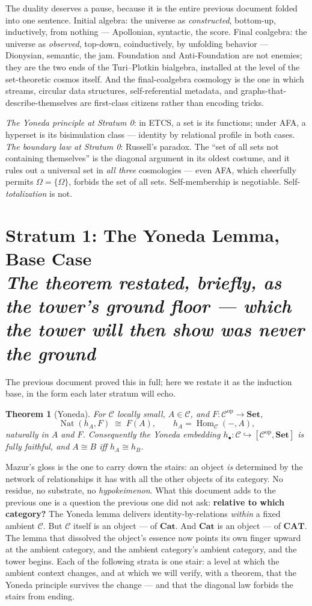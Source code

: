 \documentclass[11pt]{article}
\theoremstyle{plain}
\newtheorem{theorem}{Theorem}[section]
\theoremstyle{definition}
\theoremstyle{remark}
\newcommand{\C}{\mathcal{C}}
\newcommand{\Set}{\mathbf{Set}}
\newcommand{\Cat}{\mathbf{Cat}}
\newcommand{\CAT}{\mathbf{CAT}}
\newcommand{\Hom}{\operatorname{Hom}}
\newcommand{\Nat}{\operatorname{Nat}}
\newcommand{\op}{\mathrm{op}}
\newcommand{\stratum}[2]{\section{#1 \\ {\normalsize\normalfont\itshape #2}}}
\begin{document}
The duality deserves a pause, because it is the entire previous document folded into one sentence. Initial algebra: the universe as \emph{constructed}, bottom-up, inductively, from nothing --- Apollonian, syntactic, the score. Final coalgebra: the universe as \emph{observed}, top-down, coinductively, by unfolding behavior --- Dionysian, semantic, the jam. Foundation and Anti-Foundation are not enemies; they are the two ends of the Turi--Plotkin bialgebra, installed at the level of the set-theoretic cosmos itself. And the final-coalgebra cosmology is the one in which streams, circular data structures, self-referential metadata, and graphs-that-describe-themselves are first-class citizens rather than encoding tricks.

\begin{refrain}
\emph{The Yoneda principle at Stratum 0}: in ETCS, a set is its functions; under AFA, a hyperset is its bisimulation class --- identity by relational profile in both cases. \emph{The boundary law at Stratum 0}: Russell's paradox. The ``set of all sets not containing themselves'' is the diagonal argument in its oldest costume, and it rules out a universal set in \emph{all three} cosmologies --- even AFA, which cheerfully permits $\Omega = \{\Omega\}$, forbids the set of all sets. Self-membership is negotiable. Self-\emph{totalization} is not.
\end{refrain}

\stratum{Stratum 1: The Yoneda Lemma, Base Case}{The theorem restated, briefly, as the tower's ground floor --- which the tower will then show was never the ground}

The previous document proved this in full; here we restate it as the induction base, in the form each later stratum will echo.

\begin{theorem}[Yoneda]\label{thm:yoneda}
For $\C$ locally small, $A \in \C$, and $F\colon \C^{\op} \to \Set$,
\[
\Nat(h_A, F) \;\cong\; F(A), \qquad h_A = \Hom_\C(-,A),
\]
naturally in $A$ and $F$. Consequently the Yoneda embedding $h_\bullet\colon \C \hookrightarrow [\C^{\op}, \Set]$ is fully faithful, and $A \cong B$ iff $h_A \cong h_B$.
\end{theorem}

Mazur's gloss is the one to carry down the stairs: an object \emph{is} determined by the network of relationships it has with all the other objects of its category. No residue, no substrate, no \emph{hypokeimenon}. What this document adds to the previous one is a question the previous one did not ask: \textbf{relative to which category?} The Yoneda lemma delivers identity-by-relations \emph{within} a fixed ambient $\C$. But $\C$ itself is an object --- of $\Cat$. And $\Cat$ is an object --- of $\CAT$. The lemma that dissolved the object's essence now points its own finger upward at the ambient category, and the ambient category's ambient category, and the tower begins. Each of the following strata is one stair: a level at which the ambient context changes, and at which we will verify, with a theorem, that the Yoneda principle survives the change --- and that the diagonal law forbids the stairs from ending.
\end{document}

